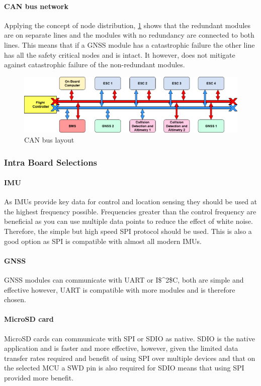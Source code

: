 \paragraph{CAN bus network}
Applying the concept of node distribution, \ref{fig:CAN_bus} shows that the redundant modules are on separate lines and the modules with no redundancy are connected to both lines. This means that if a \gls{GNSS} module has a catastrophic failure the other line has all the safety critical nodes and is intact. It however, does not mitigate against catastrophic failure of the non-redundant modules.
 \begin{figure}[h!]
 \centering
  \includegraphics[width=1\textwidth]{figs/Thomas/Intra Communication/CAN bus.png}
 \caption{CAN bus layout}
 \label{fig:CAN_bus}
 \end{figure}
 
\subsubsection{Intra Board Selections}
\paragraph{\gls{IMU}}
As \gls{IMU}s provide key data for control and location sensing they should be used at the highest frequency possible. Frequencies greater than the control frequency are beneficial as you can use multiple data points to reduce the effect of white noise. Therefore, the simple but high speed \gls{SPI} protocol should be used. This is also a good option as \gls{SPI} is compatible with almost all modern \gls{IMU}s.

\paragraph{\gls{GNSS}}
\gls{GNSS} modules can communicate with \gls{UART} or \gls{I$^2$C}, both are simple and effective however, \gls{UART} is compatible with more modules and is therefore chosen.

\paragraph{MicroSD card}
MicroSD cards can communicate with \gls{SPI} or \gls{SDIO} as native. \gls{SDIO} is the native application and is faster and more effective, however, given the limited data transfer rates required and benefit of using \gls{SPI} over multiple devices and that on the selected \gls{MCU} a \gls{SWD} pin is also required for \gls{SDIO} means that using \gls{SPI} provided more benefit.

